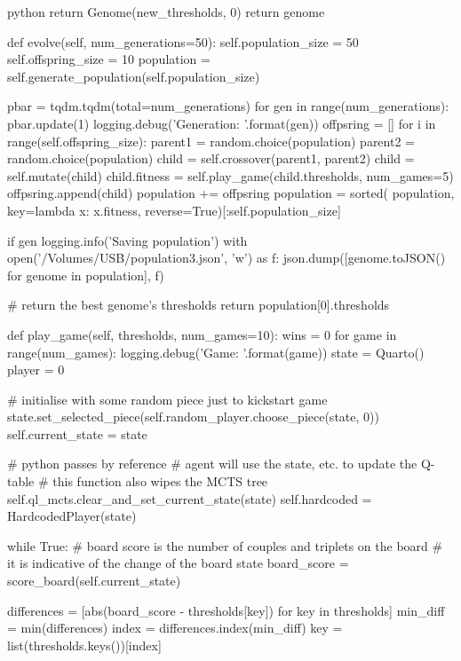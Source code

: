 \begin{mintedbox}{python}
            return Genome(new_thresholds, 0)
        return genome

    def evolve(self, num_generations=50):
        self.population_size = 50
        self.offspring_size = 10
        population = self.generate_population(self.population_size)

        pbar = tqdm.tqdm(total=num_generations)
        for gen in range(num_generations):
            pbar.update(1)
            logging.debug('Generation: {}'.format(gen))
            offpsring = []
            for i in range(self.offspring_size):
                parent1 = random.choice(population)
                parent2 = random.choice(population)
                child = self.crossover(parent1, parent2)
                child = self.mutate(child)
                child.fitness = self.play_game(child.thresholds, num_games=5)
                offpsring.append(child)
            population += offpsring
            population = sorted(
                population, key=lambda x: x.fitness, reverse=True)[:self.population_size]

            if gen %
                logging.info('Saving population')
                with open('/Volumes/USB/population3.json', 'w') as f:
                    json.dump([genome.toJSON() for genome in population], f)

        # return the best genome's thresholds
        return population[0].thresholds

    def play_game(self, thresholds, num_games=10):
        wins = 0
        for game in range(num_games):
            logging.debug('Game: {}'.format(game))
            state = Quarto()
            player = 0

            # initialise with some random piece just to kickstart game
            state.set_selected_piece(self.random_player.choose_piece(state, 0))
            self.current_state = state

            # python passes by reference
            # agent will use the state, etc. to update the Q-table
            # this function also wipes the MCTS tree
            self.ql_mcts.clear_and_set_current_state(state)
            self.hardcoded = HardcodedPlayer(state)

            while True:
                # board score is the number of couples and triplets on the board
                # it is indicative of the change of the board state
                board_score = score_board(self.current_state)

                differences = [abs(board_score - thresholds[key])
                                for key in thresholds]
                min_diff = min(differences)
                index = differences.index(min_diff)
                key = list(thresholds.keys())[index]


\end{mintedbox}
